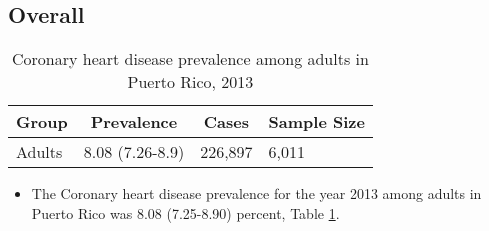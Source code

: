 
\subsection{Overall}




\begin{table}[H]
\caption{Coronary heart disease prevalence among adults in Puerto Rico, 2013\label{tab:Overall.tabl.Coronary_Heart_Disease.2013}} 
\begin{center}
\begin{tabular}{llll}
\hline\hline
\multicolumn{1}{l}{Group}&\multicolumn{1}{c}{Prevalence}&\multicolumn{1}{c}{Cases}&\multicolumn{1}{c}{Sample Size}\tabularnewline
\hline
Adults&8.08 (7.26-8.9)&226,897&6,011\tabularnewline
\hline
\end{tabular}\end{center}

\end{table}




\begin{itemize}


\item The Coronary heart disease prevalence for the year 2013 among adults in Puerto Rico was 8.08 (7.25-8.90) percent, 
Table \ref{tab:Overall.tabl.Coronary_Heart_Disease.2013}.

\end{itemize}


